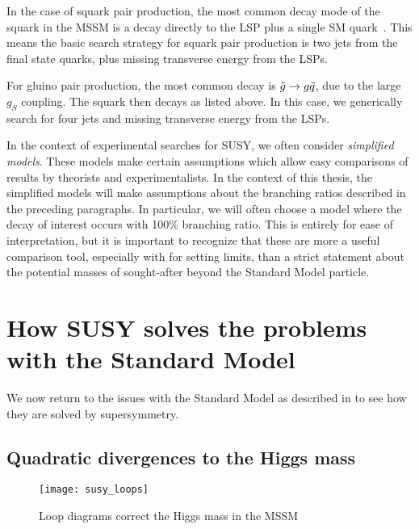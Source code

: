 In the case of squark pair production, the most common decay mode of the squark in the MSSM is a decay directly to the LSP plus a single SM quark~\cite{susyPrimer}.
This means the basic search strategy for squark pair production is two jets from the final state quarks, plus missing transverse energy from the LSPs.

For gluino pair production, the most common decay is $\tilde{g} \rightarrow g \tilde{q}$, due to the large $g_S$ coupling.
The squark then decays as listed above.
In this case, we generically search for four jets and missing transverse energy from the LSPs.

In the context of experimental searches for SUSY, we often consider \textit{simplified models}.
These models make certain assumptions which allow easy comparisons of results by theorists and experimentalists.
In the context of this thesis, the simplified models will make assumptions about the branching ratios described in the preceding paragraphs.
In particular, we will often choose a model where the decay of interest occurs with 100\% branching ratio.
This is entirely for ease of interpretation, but it is important to recognize that these are more a useful comparison tool, especially with for setting limits, than a strict statement about the potential masses of sought-after beyond the Standard Model particle.

\section{How SUSY solves the problems with the Standard Model}

We now return to the issues with the Standard Model as described in  to see how they are solved by supersymmetry.

\subsection{Quadratic divergences to the Higgs mass}

\begin{figure}[tbp]
\caption{Loop diagrams correct the Higgs mass in the MSSM}\label{fig:susy_loops}
\texttt{[image: susy\_loops]}
\end{figure}

